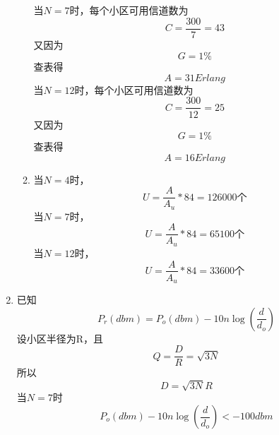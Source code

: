 \documentclass{article}
\begin{document}
\begin{enumerate}
\begin{enumerate}
              当$N=7$时，每个小区可用信道数为
              \begin{equation}
                C=\frac{300}{7}=43
              \end{equation}
              又因为
              \begin{equation}
                G=1\%
              \end{equation}
              查表得
              \begin{equation}
                A=31Erlang
              \end{equation}
              当$N=12$时，每个小区可用信道数为
              \begin{equation}
                C=\frac{300}{12}=25
              \end{equation}
              又因为
              \begin{equation}
                G=1\%
              \end{equation}
              查表得
              \begin{equation}
                A=16Erlang
              \end{equation}
        \item 当$N=4$时，
          \begin{equation}
            U=\frac{A}{A_u}*84=126000\text{个}
          \end{equation}    
          当$N=7$时，
          \begin{equation}
            U=\frac{A}{A_u}*84=65100\text{个}
          \end{equation}
          当$N=12$时，
          \begin{equation}
            U=\frac{A}{A_u}*84=33600\text{个}
          \end{equation}      
    \end{enumerate}
    \item 已知
          \begin{equation}
            P_r(dbm)=P_o(dbm)-10n\log(\frac{d}{d_o})
          \end{equation}
          设小区半径为R，且
          \begin{equation}
            Q=\frac{D}{R}=\sqrt{3N}
          \end{equation}
          所以
          \begin{equation}
            D=\sqrt{3N}R
          \end{equation}
          当$N=7$时
          \begin{equation}
            P_o(dbm)-10n\log(\frac{d}{d_o})<-100dbm

\end{equation}
\end{enumerate}
\end{document}
